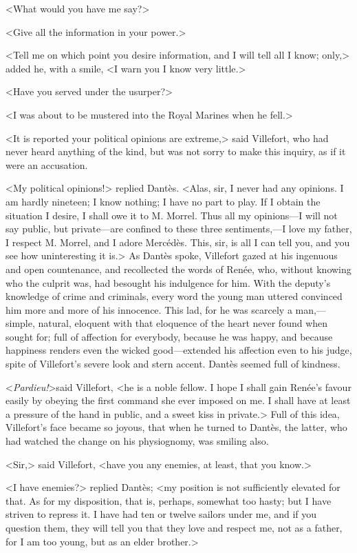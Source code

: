  <What would you have me say?> 

 <Give all the information in your power.> 

 <Tell me on which point you desire information, and I will tell all I know; only,> added he, with a smile, <I warn you I know very little.> 

 <Have you served under the usurper?> 

 <I was about to be mustered into the Royal Marines when he fell.> 

 <It is reported your political opinions are extreme,> said Villefort, who had never heard anything of the kind, but was not sorry to make this inquiry, as if it were an accusation. 

 <My political opinions!> replied Dantès. <Alas, sir, I never had any opinions. I am hardly nineteen; I know nothing; I have no part to play. If I obtain the situation I desire, I shall owe it to M. Morrel. Thus all my opinions—I will not say public, but private—are confined to these three sentiments,—I love my father, I respect M. Morrel, and I adore Mercédès. This, sir, is all I can tell you, and you see how uninteresting it is.> As Dantès spoke, Villefort gazed at his ingenuous and open countenance, and recollected the words of Renée, who, without knowing who the culprit was, had besought his indulgence for him. With the deputy's knowledge of crime and criminals, every word the young man uttered convinced him more and more of his innocence. This lad, for he was scarcely a man,—simple, natural, eloquent with that eloquence of the heart never found when sought for; full of affection for everybody, because he was happy, and because happiness renders even the wicked good—extended his affection even to his judge, spite of Villefort's severe look and stern accent. Dantès seemed full of kindness. 

 <\textit{Pardieu!}>said Villefort, <he is a noble fellow. I hope I shall gain Renée's favour easily by obeying the first command she ever imposed on me. I shall have at least a pressure of the hand in public, and a sweet kiss in private.> Full of this idea, Villefort's face became so joyous, that when he turned to Dantès, the latter, who had watched the change on his physiognomy, was smiling also. 

 <Sir,> said Villefort, <have you any enemies, at least, that you know.> 

 <I have enemies?> replied Dantès; <my position is not sufficiently elevated for that. As for my disposition, that is, perhaps, somewhat too hasty; but I have striven to repress it. I have had ten or twelve sailors under me, and if you question them, they will tell you that they love and respect me, not as a father, for I am too young, but as an elder brother.> 

